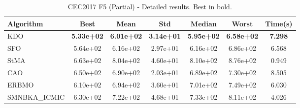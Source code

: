 \begin{table}[H]
\centering\small
\caption{CEC2017 F5 (Partial) - Detailed results. Best in bold.}
\label{tab:cec2017_F5}
\begin{tabular}{lcccccc}
\toprule
\textbf{Algorithm} & \textbf{Best} & \textbf{Mean} & \textbf{Std} & \textbf{Median} & \textbf{Worst} & \textbf{Time(s)} \\
\midrule
KDO & \textbf{5.33e+02} & \textbf{6.01e+02} & \textbf{3.14e+01} & \textbf{5.95e+02} & \textbf{6.58e+02} & \textbf{7.298} \\
SFO & 5.64e+02 & 6.16e+02 & 2.97e+01 & 6.16e+02 & 6.86e+02 & 6.568 \\
StMA & 6.63e+02 & 8.04e+02 & 4.60e+01 & 8.10e+02 & 8.76e+02 & 0.949 \\
CAO & 6.50e+02 & 6.90e+02 & 2.03e+01 & 6.89e+02 & 7.30e+02 & 8.505 \\
ERBMO & 6.10e+02 & 6.94e+02 & 3.60e+01 & 7.01e+02 & 7.49e+02 & 6.030 \\
SMNBKA_ICMIC & 6.30e+02 & 7.22e+02 & 4.68e+01 & 7.33e+02 & 8.11e+02 & 4.026 \\
\bottomrule
\end{tabular}
\end{table}
